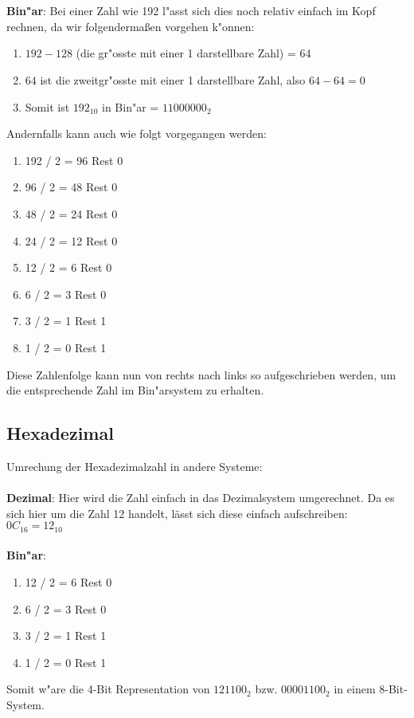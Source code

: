 \documentclass[a4paper,11pt,titlepage]{article}
\begin{document}
    \\ \\
    \noindent \textbf{Bin"ar}: Bei einer Zahl wie 192 l"asst sich dies noch relativ einfach im Kopf rechnen, da wir folgendermaßen vorgehen k"onnen:
    \begin{enumerate}
        \item $192-128$ (die gr"osste mit einer 1 darstellbare Zahl) = 64
        \item $64$ ist die zweitgr"osste mit einer 1 darstellbare Zahl, also $64-64 = 0$
        \item Somit ist $192_10$ in Bin"ar = $11000000_2$
    \end{enumerate}
    Andernfalls kann auch wie folgt vorgegangen werden:
    \begin{enumerate}
        \item 192 / 2 = 96 Rest 0
        \item 96 / 2 = 48 Rest 0
        \item 48 / 2 = 24 Rest 0
        \item 24 / 2 = 12 Rest 0
        \item 12 / 2 = 6 Rest 0
        \item 6 / 2 = 3 Rest 0
        \item 3 / 2 = 1 Rest 1
        \item 1 / 2 = 0 Rest 1
    \end{enumerate}

    \noindent Diese Zahlenfolge kann nun von rechts nach links so aufgeschrieben werden, um die entsprechende Zahl im Bin"arsystem zu erhalten.

    \subsection*{Hexadezimal}
    Umrechung der Hexadezimalzahl in andere Systeme: \\ \\
    \noindent \textbf{Dezimal}: Hier wird die Zahl einfach in das Dezimalsystem umgerechnet. Da es sich hier um die Zahl 12 handelt, lässt sich diese einfach aufschreiben:
    $0C_{16} = 12_10$ \\ \\
    \noindent \textbf{Bin"ar}:
    \begin{enumerate}
        \item 12 / 2 = 6 Rest 0
        \item 6 / 2 = 3 Rest 0
        \item 3 / 2 = 1 Rest 1
        \item 1 / 2 = 0 Rest 1
    \end{enumerate}
    Somit w"are die 4-Bit Representation von $12 1100_2$ bzw. $00001100_2$ in einem 8-Bit-System.
\end{document}
